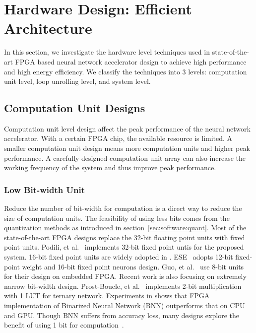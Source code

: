 \section{Hardware Design: Efficient Architecture}\label{sec:hardware}

In this section, we investigate the hardware level techniques used in state-of-the-art FPGA based neural network accelerator design to achieve high performance and high energy efficiency. We classify the techniques into 3 levels: computation unit level, loop unrolling level, and system level.

\subsection{Computation Unit Designs}\label{sec:hardware:cu}

Computation unit level design affect the peak performance of the neural network accelerator. With a certain FPGA chip, the available resource is limited. A smaller computation unit design means more computation units and higher peak performance. A carefully designed computation unit array can also increase the working frequency of the system and thus improve peak performance.

\subsubsection{Low Bit-width Unit}\label{sec:hardware:cu:lbu}
Reduce the number of bit-width for computation is a direct way to reduce the size of computation units. The feasibility of using less bits comes from the quantization methods as introduced in section~\ref{sec:software:quant}. Most of the state-of-the-art FPGA designs replace the 32-bit floating point units with fixed point units. Podili, et al.~\cite{podili2017fast} implements 32-bit fixed point untis for the proposed system. 16-bit fixed point units are widely adopted in \cite{qiu2016going, li2016high, xiao2017exploring, guan2017fp, zhang2016caffeine}. ESE~\cite{han2017ese} adopts 12-bit fixed-point weight and 16-bit fixed point neurons design. Guo, et al.~\cite{guo2017angel} use 8-bit units for their design on embedded FPGA. Recent work is also focusing on extremely narrow bit-width design. Prost-Boucle, et al.~\cite{prost2017scalable} implements 2-bit multiplication with 1 LUT for ternary network. Experiments in \cite{nurvitadhi2016accelerating} shows that FPGA implementation of Binarized Neural Network (BNN) outperforms that on CPU and GPU. Though BNN suffers from accuracy loss, many designs explore the benefit of using 1 bit for computation~\cite{li20177, nakahara2017batch, zhao2017accelerating, umuroglu2017finn, nakahara2017fully, jiao2017accelerating, moss2017high}.

